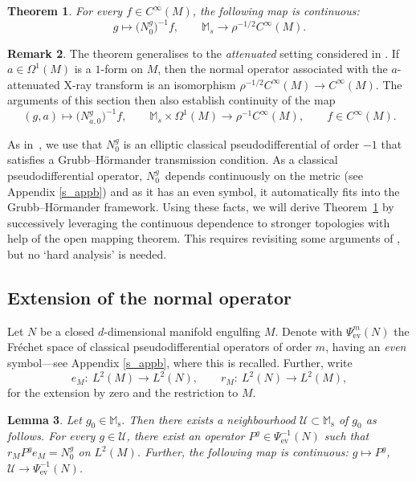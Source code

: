 \documentclass[10pt,a4paper]{amsart}
\numberwithin{equation}{section}
\newtheorem{Theorem}{Theorem}[section]
\newtheorem{Lemma}[Theorem]{Lemma}
\theoremstyle{definition}
\newtheorem{Remark}[Theorem]{Remark}
\newcommand{\M}{\mathbb{M}}
\newcommand{\ev}{\mathrm{ev}}
\newcommand{\1}{{\bf 1}}
\begin{document}
\begin{Theorem}\label{thm_ghtop}
For every $f\in C^\infty(M)$, the following map is continuous:
\begin{equation*}
 g\mapsto \bigl(N^g_0\bigr)^{-1}f,\qquad \M_s\rightarrow \rho^{-1/2} C^\infty(M).
\end{equation*}
\end{Theorem}

\begin{Remark}\label{rem_attenuatedverstappen}
The theorem generalises to the {\it attenuated} setting considered in \cite[Section~12.2]{PSU23}. If $a\in \Omega^1(M)$ is a $1$-form on $M$, then the normal operator  associated with the $a$-attenuated X-ray transform is an isomorphism $\rho^{-1/2}C^\infty(M)\to C^\infty(M)$. The arguments of this section then also establish continuity of the map
\[	
	(g,a) \mapsto \bigl(N^g_{a,0}\bigr)^{-1}f,\qquad \mathbb M_s\times \Omega^1(M)\to \rho^{-1} C^\infty(M),\qquad f\in C^\infty(M).
\]
\end{Remark}

As in~\cite{MNP19a}, we use that $N^g_0$ is an elliptic classical pseudodifferential of order $-1$ that satisfies a Grubb--H{\"o}rmander transmission condition. As a classical pseudodifferential operator, $N_0^g$~depends continuously on the metric (see Appendix \ref{s_appb}) and as it has an even symbol, it automatically fits into the Grubb--H{\"o}rmander framework. Using these facts, we will derive Theorem~\ref{thm_ghtop} by successively leveraging the continuous dependence to stronger topologies with help of the open mapping theorem. This requires revisiting some arguments of \cite{MNP19a}, but no `hard analysis' is needed.

\subsection{Extension of the normal operator} Let $N$ be a closed $d$-dimensional manifold engulfing $M$. Denote with $\Psi^{m}_\ev(N)$ the Fr{\'e}chet space of classical pseudodifferential operators of order $m$, having an {\it even} symbol---see Appendix \ref{s_appb}, where this is recalled. Further, write
\[
	e_M\colon\ L^2(M)\rightarrow L^2(N),\qquad r_M\colon\ L^2(N)\rightarrow L^2(M),
\]
for the extension by zero and the restriction to $M$.
\begin{Lemma}\label{lem_next} Let $g_0\in \M_\mathrm{s}$. Then there exists a neighbourhood $\mathcal U\subset \M_{\mathrm s}$ of $g_0$ as follows. For every $g\in \mathcal U$, there exist an operator $P^g\in \Psi^{-1}_\ev(N)$ such that
$
r_M P^g e_M = N_0^g$ on $ L^2(M)$.
Further, the following map is continuous:
$
g\mapsto P^g$, $ \mathcal U\rightarrow \Psi^{-1}_\ev(N)$.
\end{Lemma}
\end{document}
